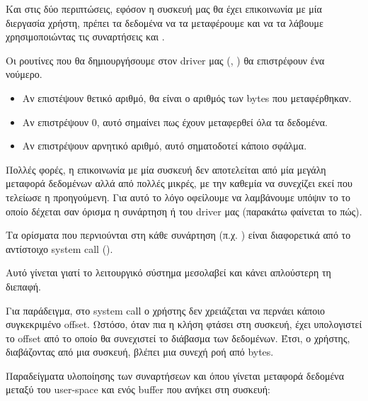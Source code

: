 \documentclass[18pt]{extarticle}
\begin{document}
Και στις δύο περιπτώσεις, εφόσον η συσκευή μας θα έχει επικοινωνία με μία διεργασία χρήστη, πρέπει τα δεδομένα να τα μεταφέρουμε 
και να τα λάβουμε χρησιμοποιώντας τις συναρτήσεις  και .

Οι ρουτίνες που θα δημιουργήσουμε στον driver μας (, ) θα επιστρέφουν ένα νούμερο. 

\begin{itemize}
    \item Αν επιστέψουν θετικό αριθμό, θα είναι ο αριθμός των bytes που μεταφέρθηκαν.
    \item Αν επιστρέψουν 0, αυτό σημαίνει πως έχουν μεταφερθεί όλα τα δεδομένα.
    \item Αν επιστρέψουν αρνητικό αριθμό, αυτό σηματοδοτεί κάποιο σφάλμα.
\end{itemize}

Πολλές φορές, η επικοινωνία με μία συσκευή δεν αποτελείται από μία μεγάλη μεταφορά δεδομένων αλλά 
από πολλές μικρές, με την καθεμία να συνεχίζει εκεί που τελείωσε η προηγούμενη.
Για αυτό το λόγο οφείλουμε να λαμβάνουμε υπόψιν το  το οποίο δέχεται σαν όρισμα η συνάρτηση  ή  του driver μας (παρακάτω φαίνεται το πώς).


\begin{info}[Σημείωση:]
    Τα ορίσματα που περνιούνται στη κάθε συνάρτηση (π.χ. ) είναι διαφορετικά από το αντίστοιχο system call ().

    Αυτό γίνεται γιατί το λειτουργικό σύστημα μεσολαβεί και κάνει απλούστερη τη διεπαφή.

Για παράδειγμα, στο system call  ο χρήστης δεν χρειάζεται να περνάει κάποιο συγκεκριμένο offset.
Ωστόσο, όταν πια η κλήση φτάσει στη συσκευή, έχει υπολογιστεί το offset από το οποίο θα συνεχιστεί το διάβασμα των δεδομένων.
Έτσι, ο χρήστης, διαβάζοντας από μια συσκευή, βλέπει μια συνεχή ροή από bytes.
\end{info}

Παραδείγματα υλοποίησης των συναρτήσεων  και  όπου γίνεται 
μεταφορά δεδομένα μεταξύ του user-space και ενός buffer που ανήκει στη συσκευή: 

\begin{file}
        
\end{file}
\end{document}
